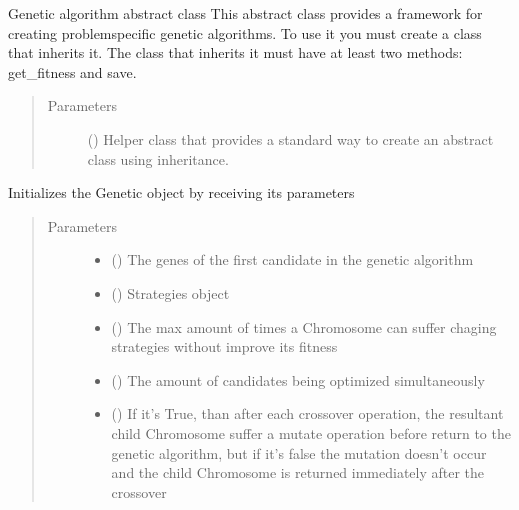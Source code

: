 \documentclass[letterpaper,10pt,english]{sphinxmanual}
\begin{document}
\begin{fulllineitems}
\sphinxAtStartPar
Genetic algorithm abstract class
This abstract class provides a framework for creating problem\sphinxhyphen{}specific genetic algorithms. To use it you must create
a class that inherits it. The class that inherits it must have at least two methods: get\_fitness and save.
\begin{quote}\begin{description}
\item[{Parameters}] \leavevmode
\sphinxAtStartPar
{} () \textendash{} Helper class that provides a standard way to create an abstract class using inheritance.

\end{description}\end{quote}

\sphinxAtStartPar
Initializes the Genetic object by receiving its parameters
\begin{quote}\begin{description}
\item[{Parameters}] \leavevmode\begin{itemize}
\item {} 
\sphinxAtStartPar
{} ({\hyperref[\detokenize{genetic:genetic.Chromosome}]{}}) \textendash{} The genes of the first candidate in the genetic algorithm

\item {} 
\sphinxAtStartPar
{} ({\hyperref[\detokenize{genetic:genetic.Strategies}]{}}) \textendash{} Strategies object

\item {} 
\sphinxAtStartPar
{} () \textendash{} The max amount of times a Chromosome can suffer chaging strategies without improve its fitness

\item {} 
\sphinxAtStartPar
{} () \textendash{} The amount of candidates being optimized simultaneously

\item {} 
\sphinxAtStartPar
{} () \textendash{} If it’s True, than after each crossover operation, the resultant child Chromosome
suffer a mutate operation before return to the genetic algorithm, but if it’s false the mutation doesn’t
occur and the child Chromosome is returned immediately after the crossover


\end{itemize}
\end{description}
\end{quote}
\end{fulllineitems}
\end{document}
